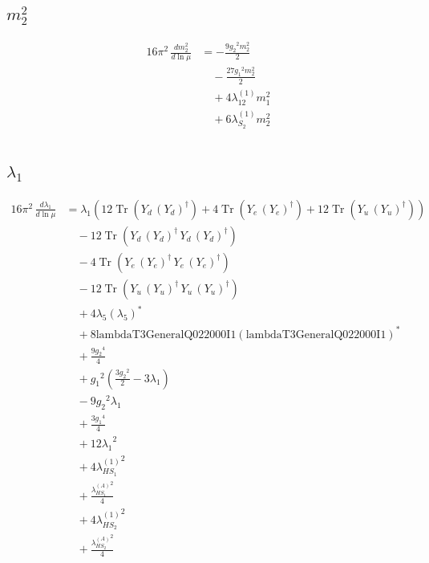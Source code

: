 \documentclass[10pt,a4paper]{article}
\begin{document}
\subsection*{$m_2^2$}
\begin{align*}
16\pi^2\,\frac{d m_2^2}{d\ln\mu} &=-\frac{9 {g_2}^2 {m_2^2}}{2} \\
&\quad -\frac{27 {g_1}^2 {m_2^2}}{2} \\
&\quad +4 {\lambda_{12}^{(1)}} {m_1^2} \\
&\quad +6 {\lambda_{S_2}^{(1)}} {m_2^2} \\
\end{align*}
\subsection*{$\lambda_1$}
\begin{align*}
16\pi^2\,\frac{d \lambda_1}{d\ln\mu} &={\lambda_1} (12 \operatorname{Tr}\!\left({Y_d}\,\left({Y_d}\right)^{\dagger}\right)+4 \operatorname{Tr}\!\left({Y_e}\,\left({Y_e}\right)^{\dagger}\right)+12 \operatorname{Tr}\!\left({Y_u}\,\left({Y_u}\right)^{\dagger}\right)) \\
&\quad -12 \operatorname{Tr}\!\left({Y_d}\,\left({Y_d}\right)^{\dagger}\,{Y_d}\,\left({Y_d}\right)^{\dagger}\right) \\
&\quad -4 \operatorname{Tr}\!\left({Y_e}\,\left({Y_e}\right)^{\dagger}\,{Y_e}\,\left({Y_e}\right)^{\dagger}\right) \\
&\quad -12 \operatorname{Tr}\!\left({Y_u}\,\left({Y_u}\right)^{\dagger}\,{Y_u}\,\left({Y_u}\right)^{\dagger}\right) \\
&\quad +4 {\lambda_5} \left({\lambda_5}\right)^{*} \\
&\quad +8 \text{lambdaT3GeneralQ022000I1} \left(\text{lambdaT3GeneralQ022000I1}\right)^{*} \\
&\quad +\frac{9 {g_2}^4}{4} \\
&\quad +{g_1}^2 \left(\frac{3 {g_2}^2}{2}-3 {\lambda_1}\right) \\
&\quad -9 {g_2}^2 {\lambda_1} \\
&\quad +\frac{3 {g_1}^4}{4} \\
&\quad +12 {\lambda_1}^2 \\
&\quad +4 {\lambda_{HS_1}^{(1)}}^2 \\
&\quad +\frac{{\lambda_{HS_1}^{(A)}}^2}{4} \\
&\quad +4 {\lambda_{HS_2}^{(1)}}^2 \\
&\quad +\frac{{\lambda_{HS_2}^{(A)}}^2}{4} \\
\end{align*}
\end{document}
